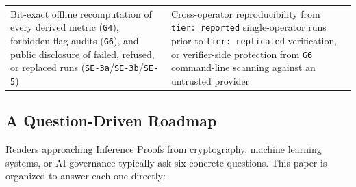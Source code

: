 \documentclass[11pt,letterpaper]{article}
\begin{document}
{\begin{longtable}{@{}>{\raggedright\arraybackslash}p{} >{\raggedright\arraybackslash}p{}@{}}
Bit-exact offline recomputation of every derived metric (\texttt{G4}), forbidden-flag audits (\texttt{G6}), and public disclosure of failed, refused, or replaced runs (\texttt{SE-3a}/\texttt{SE-3b}/\texttt{SE-5}) & Cross-operator reproducibility from \texttt{tier: reported} single-operator runs prior to \texttt{tier: replicated} verification, or verifier-side protection from \texttt{G6} command-line scanning against an untrusted provider \\
\end{longtable}
}

\subsection{A Question-Driven Roadmap}

Readers approaching Inference Proofs from cryptography, machine learning systems, or AI governance typically ask six concrete questions. This paper is organized to answer each one directly:
\end{document}
